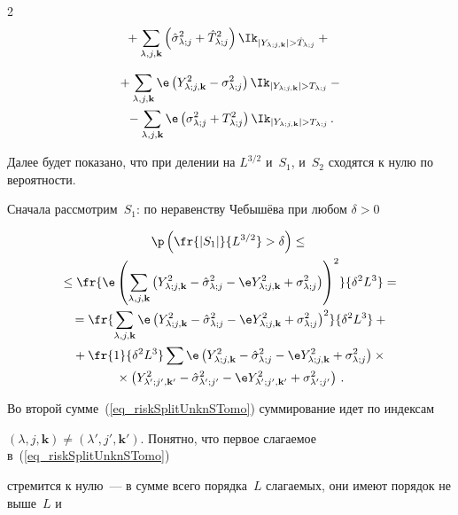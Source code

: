 \begin{multicols}{2}
\begin{multline*}
\!\!{}+ \sumljk\left(\hslj+\hTlj^2\right)\indYjkghTj +{} 


\end{multline*}





\noindent


\begin{multline}


{}+ \sumljk\e\left(\Yljk^2-\slj\right)\indYjkgTj -{}\\


{}- \sumljk\e\left(\slj+\Tlj^2\right)\indYjkgTj\,.


\label{eq_riskSplitStTomo}


\end{multline}


Далее будет показано, что при делении на $L^{3/2}$ и~$S_1$, и~$S_2$ сходятся к нулю по вероятности.





Сначала рассмотрим~$S_1$: по неравенству Чебышёва при любом $\delta>0$


\begin{multline}


\p\left( \fr{|S_1|}{L^{3/2}} > \delta \right) \leq{}\\


{}\leq


\fr{ \e\left( \sumljk \left( \Yljk^2 - \hslj - \e\Yljk^2 + \slj \right) \right)^2 }{\delta^2 L^3} ={}\\


{}= \fr{ \sumljk \e\left( \Yljk^2 - \hslj - \e\Yljk^2 + \slj \right)^2 }{ \delta^2 L^3 } + {}\\


{}+ \fr{1}{\delta^2 L^3}


 \sum \e\left( \Yljk^2 - \hslj - \e\Yljk^2 + \slj \right)\times{}\\


 {}\times \left( \Yljks^2 - \hsljs - \e\Yljks^2 + \sljs \right)\,.


\label{eq_riskSplitUnknSTomo}


\end{multline}


Во второй сумме~(\ref{eq_riskSplitUnknSTomo}) суммирование идет по индексам 


$(\lambda,j,\mathbf{k})\ne(\lambda',j',\mathbf{k}')$. Понятно, что первое слагаемое в~(\ref{eq_riskSplitUnknSTomo}) 


стремится к нулю~--- в сумме всего порядка~$L$ слагаемых, они имеют порядок не выше~$L$ и 



\end{multicols}
